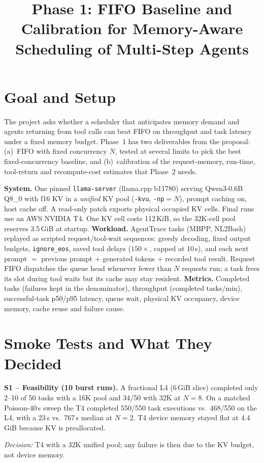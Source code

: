 \documentclass[10pt,twocolumn,letterpaper]{article}
\title{\vspace{-1.6em}\large\textbf{Phase 1: FIFO Baseline and Calibration for Memory-Aware Scheduling of Multi-Step Agents}\vspace{-1.8em}}
\author{}
\date{}
\newcommand{\dec}[1]{\par\noindent\textit{Decision:} #1\par}
\begin{document}
\maketitle

\section{Goal and Setup}
The project asks whether a scheduler that anticipates memory demand and agents returning from tool calls can beat FIFO on throughput and task latency under a fixed memory budget. Phase~1 has two deliverables from the proposal: (a)~FIFO with fixed concurrency $N$, tested at several limits to pick the best fixed-concurrency baseline, and (b)~calibration of the request-memory, run-time, tool-return and recompute-cost estimates that Phase~2 needs.

\textbf{System.} One pinned \texttt{llama-server} (llama.cpp b11780) serving Qwen3-0.6B Q8\_0 with f16 KV in a \emph{unified} KV pool (\texttt{-kvu}, \texttt{-np}$=N$), prompt caching on, host cache off. A read-only patch exports physical occupied KV cells. Final runs use an AWS NVIDIA T4. One KV cell costs 112\,KiB, so the 32K-cell pool reserves 3.5\,GiB at startup.
\textbf{Workload.} AgentTrace tasks (MBPP, NL2Bash) replayed as scripted request/tool-wait sequences: greedy decoding, fixed output budgets, \texttt{ignore\_eos}, saved tool delays ($150\times$, capped at 10\,s), and each next prompt $=$ previous prompt $+$ generated tokens $+$ recorded tool result. Request FIFO dispatches the queue head whenever fewer than $N$ requests run; a task frees its slot during tool waits but its cache may stay resident.
\textbf{Metrics.} Completed tasks (failures kept in the denominator), throughput (completed tasks/min), successful-task p50/p95 latency, queue wait, physical KV occupancy, device memory, cache reuse and failure cause.

\section{Smoke Tests and What They Decided}
\textbf{S1 -- Feasibility (10 burst runs).} A fractional L4 (6\,GiB slice) completed only 2--10 of 50 tasks with a 16K pool and 34/50 with 32K at $N{=}8$. On a matched Poisson-40\,s sweep the T4 completed 550/550 task executions vs.\ 468/550 on the L4, with a 23\,s vs.\ 767\,s median at $N{=}2$. T4 device memory stayed flat at 4.4\,GiB because KV is preallocated.
\dec{T4 with a 32K unified pool; any failure is then due to the KV budget, not device memory.}
\end{document}
